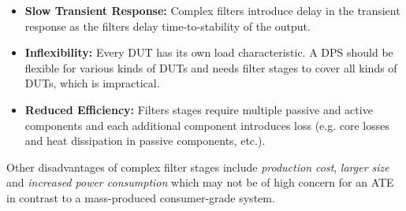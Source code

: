\begin{itemize}[topsep=8pt,itemsep=4pt,partopsep=4pt, parsep=4pt]
    \item \textbf{Slow Transient Response:}
    Complex filters introduce delay in the transient response as the filters
    delay time-to-stability of the output.

    \item \textbf{Inflexibility:}
    Every \ac{DUT} has its own load characteristic.
    A \ac{DPS} should be flexible for various kinds of \acp{DUT} and
    needs filter stages to cover all kinds of \acp{DUT}, which is impractical.

    \item \textbf{Reduced Efficiency:}
    Filters stages require multiple passive and active components and
    each additional component introduces loss (e.g. core losses and heat
    dissipation in passive components, etc.).

\end{itemize}

Other disadvantages of complex filter stages include \emph{production cost},
\emph{larger size} and \emph{increased power consumption} which may not be of
high concern for an \ac{ATE} in contrast to a mass-produced consumer-grade
system.

